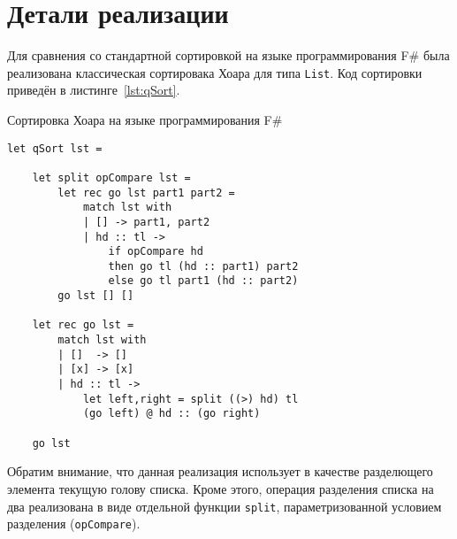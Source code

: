 \section{Детали реализации}

Для сравнения со стандартной сортировкой на языке программирования F\# была реализована классическая сортировака Хоара для типа \verb|List|. 
Код сортировки приведён в листинге~\ref{lst:qSort}.


\begin{algorithm}[h]
\caption{Сортировка Хоара на языке программирования F\#}
\label{lst:qSort}
\begin{verbatim}
let qSort lst =

    let split opCompare lst =
        let rec go lst part1 part2 =
            match lst with
            | [] -> part1, part2
            | hd :: tl ->
                if opCompare hd
                then go tl (hd :: part1) part2
                else go tl part1 (hd :: part2)
        go lst [] []

    let rec go lst =
        match lst with
        | []  -> []
        | [x] -> [x]
        | hd :: tl ->
            let left,right = split ((>) hd) tl
            (go left) @ hd :: (go right)

    go lst
\end{verbatim}
\end{algorithm}

Обратим внимание, что данная реализация использует в качестве разделющего элемента текущую голову списка.
Кроме этого, операция разделения списка на два реализована в виде отдельной функции \verb|split|, параметризованной условием разделения (\verb|opCompare|).